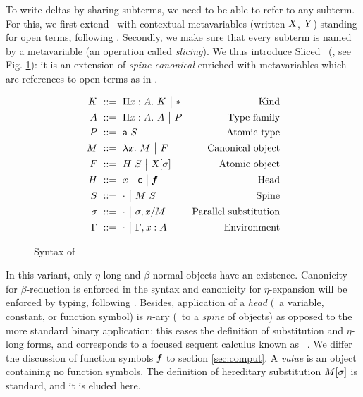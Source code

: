 \documentclass{llncs}
\begin{document}
To write deltas by sharing subterms, we need to be able to refer to
any subterm. For this, we first extend \LF\ with contextual
metavariables (written $\text{\textsl{X}}$, $\text{\textsl{Y}}$) standing for open terms,
following \cite{nanevski2008contextual}. Secondly, we make sure that
every subterm is named by a metavariable (an operation called
\emph{slicing}). We thus introduce Sliced \LF\ (\SLF, see
Fig. \ref{fig:syntax-LF}): it is an extension of \emph{spine canonical
  \LF} \cite{pfenning2007term} enriched with metavariables which are
references to open terms as in \cite{nanevski2008contextual}.

\begin{figure}[t]
  \begin{align*}
    K &\ ::=\  \Pi{\ensuremath{\text{\textit{x}}}}:{A}.\  K \ {\big|}\  \mathsf{*} &
    \text{Kind}\\
    A &\ ::=\  \Pi{\ensuremath{\text{\textit{x}}}}:{A}.\  A \ {\big|}\  P &
    \text{Type family} \\
    P &\ ::=\  {\text{\textsf{a}}}\  S &
    \text{Atomic type} \\
    M &\ ::=\  \lambda{\ensuremath{\text{\textit{x}}}}.\  M \ {\big|}\  F &
    \text{Canonical object} \\
    F &\ ::=\  {H}\  S \ {\big|}\  {\text{\textsl{X}}}[{\sigma}] &
    \text{Atomic object} \\
    H &\ ::=\  \text{\textit{x}} \ {\big|}\  \text{\textsf{c}} \ {\big|}\  \text{\textit{\textbf{f}}} &
    \text{Head}\\
    S &\ ::=\  \cdot \ {\big|}\  {M}\ {S} &
    \text{Spine}\\
    \sigma &\ ::=\  \cdot \ {\big|}\  {\sigma},{{\text{\textit{x}}}/{M}} &
    \text{Parallel substitution} \\
    \Gamma &\ ::=\  \cdot \ {\big|}\  {\Gamma},{{\text{\textit{x}}}:{A}} &
    \text{Environment}
  \end{align*}
  \caption{Syntax of \SLF}
  \label{fig:syntax-LF}
\end{figure}

In this variant, only $\eta$-long and $\beta$-normal objects have an
existence. Canonicity for $\beta$-reduction is enforced in the syntax
and canonicity for $\eta$-expansion will be enforced by typing,
following \cite{hl07mechanizing}. Besides, application of a
\emph{head} (\ie\ a variable, constant, or function symbol) is $n$-ary
(\ie\ to a \emph{spine} of objects) as opposed to the more standard
binary application: this eases the definition of substitution and
$\eta$-long forms, and corresponds to a focused sequent calculus known
as ~\cite{herbelin1995lambda}. We differ the discussion
of function symbols $\text{\textit{\textbf{f}}}$ to section \ref{sec:comput}. A
\emph{value} is an object containing no function symbols. The
definition of hereditary substitution ${M}[{\sigma}]$ is standard,
and it is eluded here.
\end{document}
